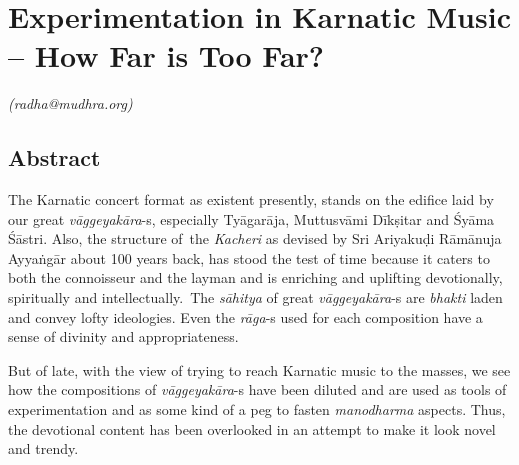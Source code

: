 
\chapter{Experimentation in Karnatic Music – How Far is Too Far?}\label{chapter4}


\vspace{-.3cm}


\begin{flushright}
\textit{(radha@mudhra.org)}
\end{flushright}


\section*{Abstract}

The Karnatic concert format as existent presently, stands on the edifice laid by our great \textit{vāggeyakāra}-s, especially Tyāgarāja, Muttusvāmi Dīkṣitar and Śyāma Śāstri. Also, the structure of the \textit{Kacheri} as devised by Sri Ariyakuḍi Rāmānuja Ayyaṅgār about 100 years back, has stood the test of time because it caters to both the connoisseur and the layman and is enriching and uplifting devotionally, spiritually and intellectually. The \textit{sāhitya} of great \textit{vāggeyakāra}-s are \textit{bhakti} laden and convey lofty ideologies. Even the \textit{rāga}-s used for each composition have a sense of divinity and appropriateness.

But of late, with the view of trying to reach Karnatic music to the masses, we see how the compositions of \textit{vāggeyakāra}-s have been diluted and are used as tools of experimentation and as some kind of a peg to fasten \textit{manodharma} aspects. Thus, the devotional content has been overlooked in an attempt to make it look novel and trendy.

